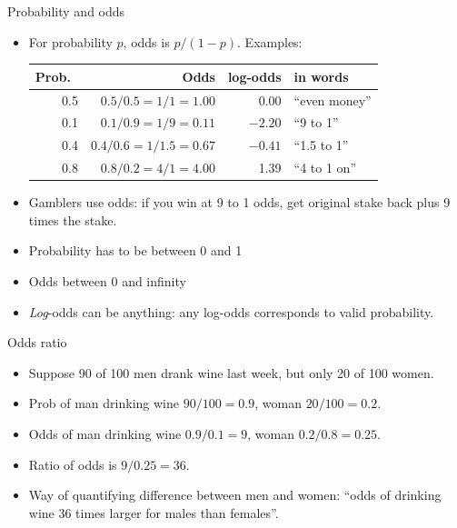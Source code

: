 \begin{frame}[fragile]{Probability and odds}
  
  \begin{itemize}
  \item For probability $p$, odds is $p/(1-p)$. Examples:
    \vfill
    \begin{tabular}{rrrl}
      \hline
      Prob.\ & Odds & log-odds & in words\\
      \hline
      0.5 & $0.5/0.5=1/1=1.00$ & 0.00 &  ``even money''\\
      0.1 & $0.1/0.9=1/9=0.11$ & $-2.20$ & ``9 to 1''\\
      0.4 & $0.4/0.6=1/1.5=0.67$ & $-0.41$ & ``1.5 to 1''\\
      0.8 & $0.8/0.2=4/1=4.00$ & 1.39 & ``4 to 1 on''\\
      \hline
    \end{tabular}
    \vfill
  \item Gamblers use odds: if you win at 9 to 1 odds, get original
    stake back plus 9 times the stake.
  \item Probability has to be between 0 and 1
  \item Odds between 0 and infinity
  \item \emph{Log}-odds can be anything: any log-odds corresponds to
    valid probability.
  \end{itemize}
  
\end{frame}

\begin{frame}[fragile]{Odds ratio}
  
  \begin{itemize}
  \item Suppose 90 of 100 men drank wine last week, but only 20 of 100 women.
  \item Prob of man drinking wine $90/100=0.9$, woman $20/100=0.2$.
  \item Odds of man drinking wine $0.9/0.1=9$, woman $0.2/0.8=0.25$.
  \item Ratio of odds is $9/0.25=36$.
  \item Way of quantifying difference between men and women: ``odds of
    drinking wine 36 times larger for males than females''. 
  \end{itemize}
  
\end{frame}

